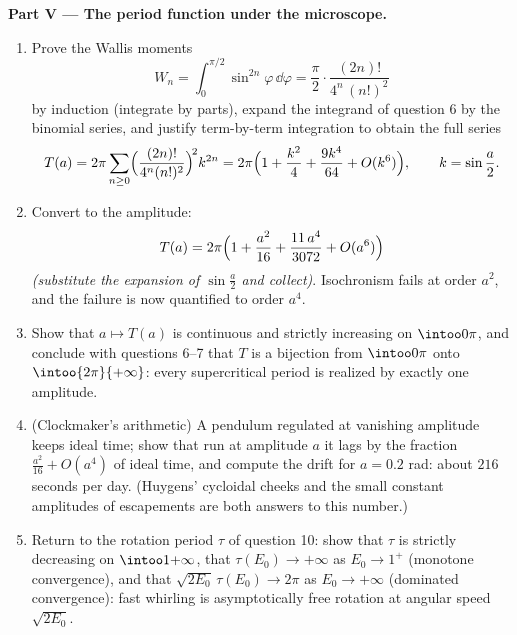 \begin{problem}
\medskip
\noindent\textbf{Part V --- The period function under the
microscope.}
\begin{enumerate}[resume]
  \item Prove the Wallis moments
        \[
        W_n = \int_0^{\pi/2}\sin^{2n}\varphi\,\dd\varphi
        = \frac\pi2\cdot\frac{(2n)!}{4^n\,(n!)^2}
        \]
        by induction (integrate by parts), expand the
        integrand of question 6 by the binomial series, and
        justify term-by-term integration to obtain the full
        series
        \[
        T(a) = 2\pi\sum_{n\geq0}
        \Bigl(\frac{(2n)!}{4^n(n!)^2}\Bigr)^{\!2}k^{2n}
        = 2\pi\Bigl(1 + \frac{k^2}4 + \frac{9k^4}{64}
        + O(k^6)\Bigr),
        \qquad k = \sin\frac a2 .
        \]
  \item Convert to the amplitude:
        \[
        T(a) = 2\pi\Bigl(1 + \frac{a^2}{16} +
        \frac{11\,a^4}{3072} + O(a^6)\Bigr)
        \]
        \emph{(substitute the expansion of $\sin\frac a2$
        and collect)}. Isochronism fails at order $a^2$, and
        the failure is now quantified to order $a^4$.
  \item Show that $a \mapsto T(a)$ is continuous and
        strictly increasing on $\intoo0\pi$, and conclude
        with questions 6--7 that $T$ is a bijection from
        $\intoo0\pi$ onto $\intoo{2\pi}{+\infty}$: every
        supercritical period is realized by exactly one
        amplitude.
  \item (Clockmaker's arithmetic) A pendulum regulated at
        vanishing amplitude keeps ideal time; show that run
        at amplitude $a$ it lags by the fraction
        $\frac{a^2}{16} + O(a^4)$ of ideal time, and compute
        the drift for $a = 0.2$ rad: about $216$ seconds per
        day. (Huygens' cycloidal cheeks and the small
        constant amplitudes of escapements are both answers
        to this number.)
  \item Return to the rotation period $\tau$ of question
        10: show that $\tau$ is strictly decreasing on
        $\intoo1{+\infty}$, that $\tau(E_0) \to +\infty$ as
        $E_0 \to 1^+$ (monotone convergence), and that
        $\sqrt{2E_0}\,\tau(E_0) \to 2\pi$ as $E_0 \to
        +\infty$ (dominated convergence): fast whirling is
        asymptotically free rotation at angular speed
        $\sqrt{2E_0}$.
\end{enumerate}


\end{problem}

